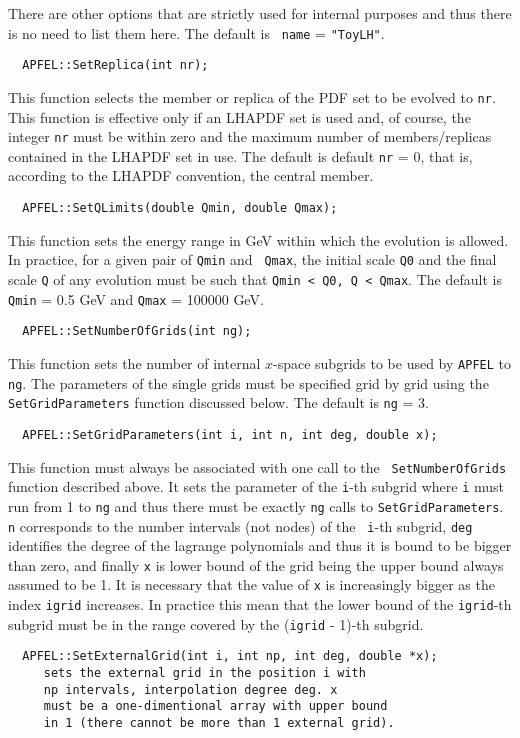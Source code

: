 \documentclass[11pt,a4paper]{article}
\begin{document}
There are other options that are strictly used for internal purposes
and thus there is no need to list them here. The default is {\tt
  name} = {\tt "ToyLH"}.
\begin{lstlisting}
  APFEL::SetReplica(int nr);
\end{lstlisting}
This function selects the member or replica of the PDF set to be
evolved to {\tt nr}. This function is effective only if an LHAPDF
set is used and, of course, the integer {\tt nr} must be within zero
and the maximum number of members/replicas contained in the LHAPDF set
in use. The default is default {\tt nr} = 0, that is, according to
the LHAPDF convention, the central member.
\begin{lstlisting}
  APFEL::SetQLimits(double Qmin, double Qmax);
\end{lstlisting}
This function sets the energy range in GeV within which the evolution
is allowed. In practice, for a given pair of {\tt Qmin} and {\tt
  Qmax}, the initial scale {\tt Q0} and the final scale {\tt Q} of any
evolution must be such that {\tt Qmin < Q0, Q < Qmax}. The default is
{\tt Qmin} = 0.5 GeV and {\tt Qmax} = 100000 GeV.
\begin{lstlisting}
  APFEL::SetNumberOfGrids(int ng);
\end{lstlisting}
This function sets the number of internal $x$-space subgrids to be
used by {\tt APFEL} to {\tt ng}. The parameters of the single grids
must be specified grid by grid using the {\tt SetGridParameters}
function discussed below. The default is {\tt ng} = 3.
\begin{lstlisting}
  APFEL::SetGridParameters(int i, int n, int deg, double x);
\end{lstlisting}
This function must always be associated with one call to the {\tt
  SetNumberOfGrids} function described above. It sets the parameter of
the {\tt i}-th subgrid where {\tt i} must run from 1 to {\tt ng} and
thus there must be exactly {\tt ng} calls to {\tt SetGridParameters}.
{\tt n} corresponds to the number intervals (not nodes) of the {\tt
  i}-th subgrid, {\tt deg} identifies the degree of the lagrange
polynomials and thus it is bound to be bigger than zero, and finally
{\tt x} is lower bound of the grid being the upper bound always
assumed to be 1. It is necessary that the value of {\tt x} is
increasingly bigger as the index {\tt igrid} increases. In practice
this mean that the lower bound of the {\tt igrid}-th subgrid must be
in the range covered by the ({\tt igrid} - 1)-th subgrid.
\begin{lstlisting}
  APFEL::SetExternalGrid(int i, int np, int deg, double *x);
     sets the external grid in the position i with
     np intervals, interpolation degree deg. x
     must be a one-dimentional array with upper bound
     in 1 (there cannot be more than 1 external grid).
\end{lstlisting}
\end{document}
